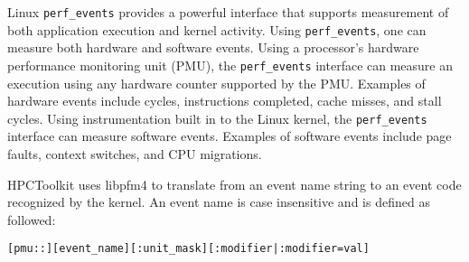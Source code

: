 \documentclass[english]{article}
\begin{document}
Linux \texttt{perf\_events} provides a powerful interface that supports 
measurement of both application execution and kernel activity. 
Using
\texttt{perf\_events}, one can measure both hardware and software events. 
Using a processor's hardware performance monitoring unit (PMU), the
\texttt{perf\_events} interface can measure an execution using any hardware counter
supported by the PMU. Examples of hardware events include cycles, instructions
completed, cache misses, and stall cycles. Using instrumentation built in to the Linux kernel,
the \texttt{perf\_events} interface can measure software events. Examples of software events include page
faults, context switches, and CPU migrations. 


HPCToolkit uses libpfm4 to translate from an event name string to an event code recognized by the kernel. 
An event name is case insensitive and is defined as followed:
\begin{verbatim}
[pmu::][event_name][:unit_mask][:modifier|:modifier=val] 
\end{verbatim}
\end{document}

